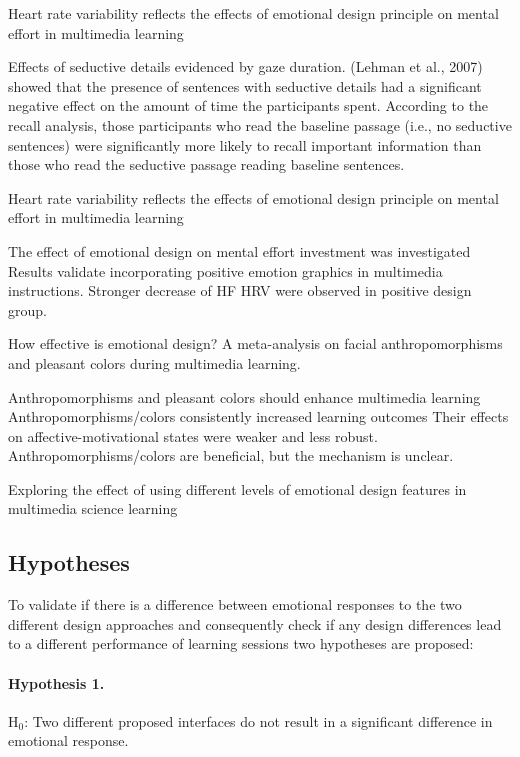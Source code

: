 		\cite{Le2018} Heart rate variability reflects the effects of emotional design principle on mental effort in multimedia learning
		
		\cite{Plass2016}
		
		\cite{Chang2014} Effects of seductive details evidenced by gaze duration.
		(Lehman et al., 2007) showed that the presence of sentences with seductive details had a significant
		negative effect on the amount of time the participants spent. According to the recall analysis, those
		participants who read the baseline passage (i.e., no seductive
		sentences) were significantly more likely to recall important information than those who read the seductive passage
		reading baseline sentences.
		
		\cite{Le2018} Heart rate variability reflects the effects of emotional design principle on mental effort in multimedia learning
		
		The effect of emotional design on mental effort investment was investigated
		Results validate incorporating positive emotion graphics in multimedia instructions.
		Stronger decrease of HF HRV were observed in positive design group.
		
		\cite{Brom2018} How effective is emotional design? A meta-analysis on facial anthropomorphisms and pleasant colors during multimedia learning.
		
		Anthropomorphisms and pleasant colors should enhance multimedia learning
		Anthropomorphisms/colors consistently increased learning outcomes
		Their effects on affective-motivational states were weaker and less robust.
		Anthropomorphisms/colors are beneficial, but the mechanism is unclear.
		\cite{Lee2014}
		
		\cite{Uzun2018} Exploring the effect of using different levels of emotional design features in multimedia science learning
		
		
	
	\subsection{Hypotheses} \label{sec:hypothesis}
	
		To validate if there is a difference between emotional responses to the two different design approaches and consequently check if any design differences lead to a different performance of learning sessions two hypotheses are proposed:
	
		\paragraph{Hypothesis 1.} H$_{0}$: Two different proposed interfaces do not result in a significant difference in emotional response.
		
